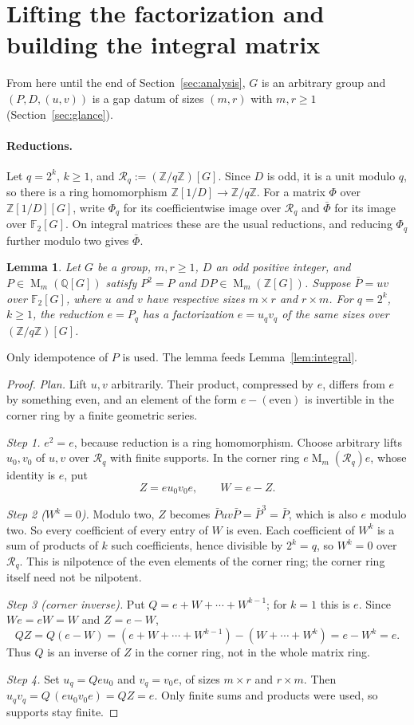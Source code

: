 \documentclass[11pt]{article}
\newtheorem{lemma}[theorem]{Lemma}
\theoremstyle{remark}
\numberwithin{equation}{section}
\newcommand{\F}{\mathbb F}
\newcommand{\Z}{\mathbb Z}
\newcommand{\Q}{\mathbb Q}
\newcommand{\Mat}{\operatorname{M}}
\begin{document}
\section{Lifting the factorization and building the integral matrix}
\label{sec:lifting}

From here until the end of Section~\ref{sec:analysis}, $G$ is an arbitrary group and $(P,D,(u,v))$ is a gap datum of sizes $(m,r)$ with $m,r\ge1$ (Section~\ref{sec:glance}).

\paragraph{Reductions.}
Let $q=2^k$, $k\ge1$, and $\mathcal R_q:=(\Z/q\Z)[G]$. Since $D$ is odd, it is a unit modulo $q$, so there is a ring homomorphism $\Z[1/D]\to\Z/q\Z$. For a matrix $\Phi$ over $\Z[1/D][G]$, write $\Phi_q$ for its coefficientwise image over $\mathcal R_q$ and $\bar\Phi$ for its image over $\F_2[G]$. On integral matrices these are the usual reductions, and reducing $\Phi_q$ further modulo two gives $\bar\Phi$.

\begin{lemma}\label{lem:lift}
Let $G$ be a group, $m,r\ge1$, $D$ an odd positive integer, and
$P\in\Mat_m(\Q[G])$ satisfy $P^2=P$ and
$DP\in\Mat_m(\Z[G])$. Suppose $\bar P=uv$ over $\F_2[G]$, where $u$ and $v$
have respective sizes $m\times r$ and $r\times m$. For $q=2^k$,
$k\ge1$, the reduction $e=P_q$ has a factorization
$e=u_qv_q$ of the same sizes over $(\Z/q\Z)[G]$.
\end{lemma}

Only idempotence of $P$ is used. The lemma feeds Lemma~\ref{lem:integral}.

\begin{proof}
\emph{Plan.} Lift $u,v$ arbitrarily. Their product, compressed by $e$, differs from $e$ by something even, and an element of the form $e-(\text{even})$ is invertible in the corner ring by a finite geometric series.

\emph{Step 1.} $e^2=e$, because reduction is a ring homomorphism. Choose arbitrary lifts $u_0,v_0$ of $u,v$ over $\mathcal R_q$ with finite supports. In the corner ring $e\Mat_m(\mathcal R_q)e$, whose identity is $e$, put
\[
 Z=eu_0v_0e,\qquad W=e-Z.
\]

\emph{Step 2 ($W^k=0$).} Modulo two, $Z$ becomes $\bar Puv\bar P=\bar P^3=\bar P$, which is also $e$ modulo two. So every coefficient of every entry of $W$ is even. Each coefficient of $W^k$ is a sum of products of $k$ such coefficients, hence divisible by $2^k=q$, so $W^k=0$ over $\mathcal R_q$. This is nilpotence of the even elements of the corner ring; the corner ring itself need not be nilpotent.

\emph{Step 3 (corner inverse).} Put $Q=e+W+\cdots+W^{k-1}$; for $k=1$ this is $e$. Since $We=eW=W$ and $Z=e-W$,
\[
 QZ=Q(e-W)=(e+W+\cdots+W^{k-1})-(W+\cdots+W^{k})=e-W^k=e.
\]
Thus $Q$ is an inverse of $Z$ in the corner ring, not in the whole matrix ring.

\emph{Step 4.} Set $u_q=Qeu_0$ and $v_q=v_0e$, of sizes $m\times r$ and $r\times m$. Then $u_qv_q=Q\,(eu_0v_0e)=QZ=e$. Only finite sums and products were used, so supports stay finite.
\end{proof}
\end{document}
